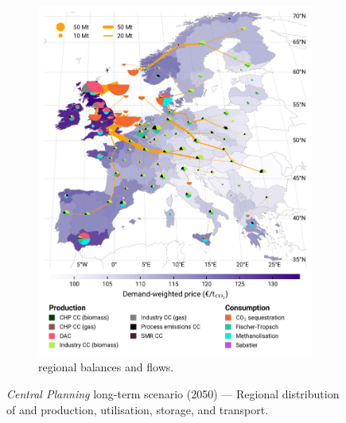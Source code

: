 \documentclass[preprint,12pt,sort&compress]{elsarticle}
\begin{document}
\begin{figure}[htbp]
\begin{subfigure}[t]{0.49\textwidth}
      \includegraphics[width=1\textwidth]{maps/greenfield-pipelines/base_s_adm___2050-balance_map_co2_stored} 
      \vspace{-0.7cm}
      \caption{ regional balances and flows.}
      \label{fig:CP_lt_2050_co2}
  \end{subfigure}
  \caption{\textit{Central Planning} long-term scenario (2050) --- Regional distribution of  and  production, utilisation, storage, and transport.}
  \label{fig:CP_lt_2050}
\end{figure}

\clearpage
 

\end{document}
